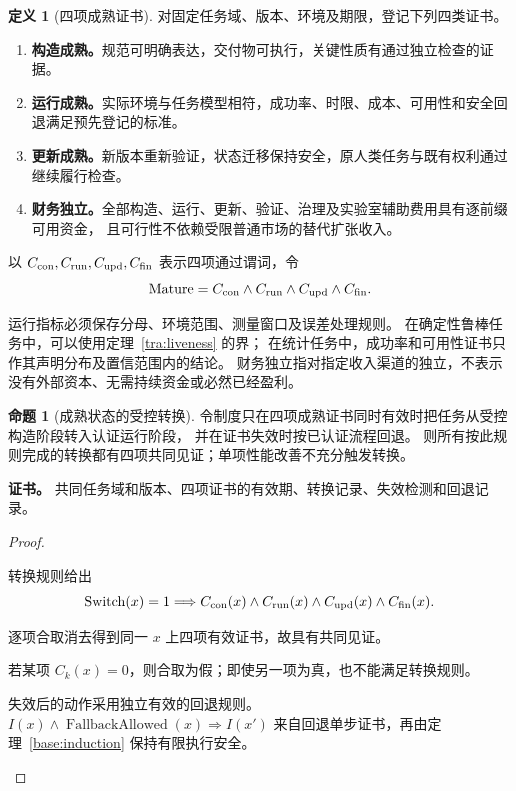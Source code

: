 \documentclass[UTF8,12pt,a4paper,openany,fontset=none,zihao=false]{ctexrep}
\theoremstyle{definition}
\newtheorem{definition}{定义}[chapter]
\newtheorem{proposition}{命题}[chapter]
\newenvironment{certificate}{\par\noindent\textbf{证书。}\ignorespaces}{\par}
\newcommand{\1}{\mathbf 1}
\begin{document}
\begin{definition}[四项成熟证书]
\label{tra:maturity}
对固定任务域、版本、环境及期限，登记下列四类证书。
\begin{enumerate}
\item \textbf{构造成熟。}规范可明确表达，交付物可执行，关键性质有通过独立检查的证据。
\item \textbf{运行成熟。}实际环境与任务模型相符，成功率、时限、成本、可用性和安全回退满足预先登记的标准。
\item \textbf{更新成熟。}新版本重新验证，状态迁移保持安全，原人类任务与既有权利通过继续履行检查。
\item \textbf{财务独立。}全部构造、运行、更新、验证、治理及实验室辅助费用具有逐前缀可用资金，
且可行性不依赖受限普通市场的替代扩张收入。
\end{enumerate}
以 \(C_{\rm con},C_{\rm run},C_{\rm upd},C_{\rm fin}\) 表示四项通过谓词，令
\[
\operatorname{Mature}=C_{\rm con}\land C_{\rm run}\land C_{\rm upd}\land C_{\rm fin}.
\]
\end{definition}

运行指标必须保存分母、环境范围、测量窗口及误差处理规则。
在确定性鲁棒任务中，可以使用定理~\ref{tra:liveness} 的界；
在统计任务中，成功率和可用性证书只作其声明分布及置信范围内的结论。
财务独立指对指定收入渠道的独立，不表示没有外部资本、无需持续资金或必然已经盈利。

\begin{proposition}[成熟状态的受控转换]
\label{tra:phase-switch}
令制度只在四项成熟证书同时有效时把任务从受控构造阶段转入认证运行阶段，
并在证书失效时按已认证流程回退。
则所有按此规则完成的转换都有四项共同见证；单项性能改善不充分触发转换。
\end{proposition}
\begin{certificate}
共同任务域和版本、四项证书的有效期、转换记录、失效检测和回退记录。
\end{certificate}
\begin{proof}
\begin{semanticsteps}
\item 转换规则给出
\[
\operatorname{Switch}(x)=1
\Longrightarrow C_{\rm con}(x)\land C_{\rm run}(x)
\land C_{\rm upd}(x)\land C_{\rm fin}(x).
\]
\item 逐项合取消去得到同一 \(x\) 上四项有效证书，故具有共同见证。
\item 若某项 \(C_k(x)=0\)，则合取为假；即使另一项为真，也不能满足转换规则。
\item 失效后的动作采用独立有效的回退规则。
\(I(x)\land\operatorname{FallbackAllowed}(x)\Rightarrow I(x')\)
来自回退单步证书，再由定理~\ref{base:induction} 保持有限执行安全。
\end{semanticsteps}
\end{proof}
\end{document}
